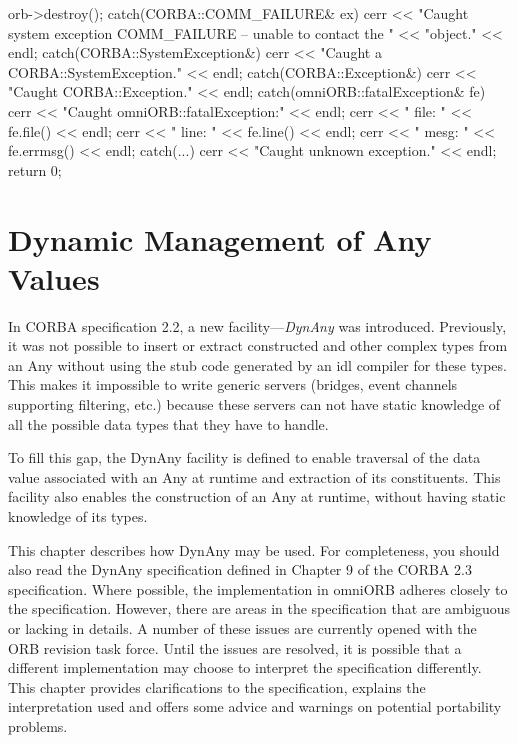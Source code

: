 \documentclass[11pt,twoside,a4paper]{book}
\newcommand{\term}[1]{\textit{#1}}
\begin{document}
\begin{cxxlisting}
{{    orb->destroy();
  }
  catch(CORBA::COMM_FAILURE& ex) {
    cerr << "Caught system exception COMM_FAILURE -- unable to contact the "
         << "object." << endl;
  }
  catch(CORBA::SystemException&) {
    cerr << "Caught a CORBA::SystemException." << endl;
  }
  catch(CORBA::Exception&) {
    cerr << "Caught CORBA::Exception." << endl;
  }
  catch(omniORB::fatalException& fe) {
    cerr << "Caught omniORB::fatalException:" << endl;
    cerr << "  file: " << fe.file() << endl;
    cerr << "  line: " << fe.line() << endl;
    cerr << "  mesg: " << fe.errmsg() << endl;
  }
  catch(...) {
    cerr << "Caught unknown exception." << endl;
  }
  return 0;
}
\end{cxxlisting}



\chapter{Dynamic Management of Any Values}


In CORBA specification 2.2, a new facility---\term{DynAny} was
introduced. Previously, it was not possible to insert or extract
constructed and other complex types from an Any without using the stub
code generated by an idl compiler for these types. This makes it
impossible to write generic servers (bridges, event channels
supporting filtering, etc.) because these servers can not have static
knowledge of all the possible data types that they have to handle.

To fill this gap, the DynAny facility is defined to enable traversal
of the data value associated with an Any at runtime and extraction of
its constituents. This facility also enables the construction of an
Any at runtime, without having static knowledge of its types.

This chapter describes how DynAny may be used. For completeness, you
should also read the DynAny specification defined in Chapter 9 of the
CORBA 2.3 specification. Where possible, the implementation in omniORB
adheres closely to the specification. However, there are areas in the
specification that are ambiguous or lacking in details. A number of
these issues are currently opened with the ORB revision task force.
Until the issues are resolved, it is possible that a different
implementation may choose to interpret the specification differently.
This chapter provides clarifications to the specification, explains
the interpretation used and offers some advice and warnings on
potential portability problems.
\end{document}
